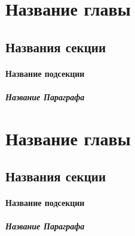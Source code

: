 \chapter{Название главы}
  \section{Названия секции}
    \subsubsection{Название подсекции}
      \paragraph{Название Параграфа}
        \lipsum[2]\cite{BibExampleRU}


\chapter{Название главы}
  \section{Названия секции}
    \subsubsection{Название подсекции}
      \paragraph{Название Параграфа}
        \lipsum[2]\cite{BibExampleRU}
